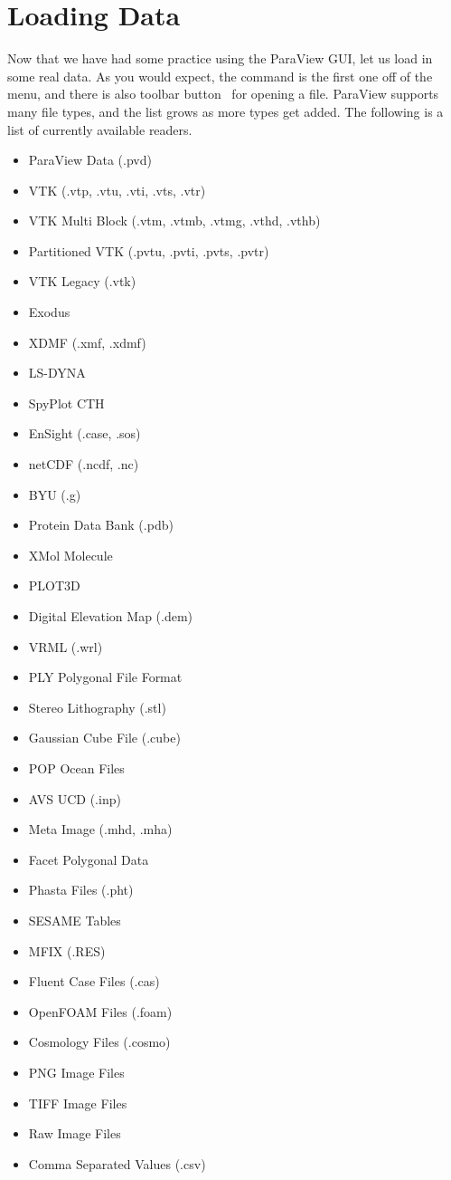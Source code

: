 \section{Loading Data}

Now that we have had some practice using the ParaView GUI, let us load in
some real data.  As you would expect, the  command is the first
one off of the  menu, and there is also toolbar
button~ for opening a file.  ParaView supports many file
types, and the list grows as more types get added.  The following is a list
of currently available readers.

\begin{multicols}{2}
  \begin{itemize}
  \item ParaView Data (.pvd)
  \item VTK (.vtp, .vtu, .vti, .vts, .vtr)
  \item VTK Multi Block (.vtm, .vtmb, .vtmg, .vthd, .vthb)
  \item Partitioned VTK (.pvtu, .pvti, .pvts, .pvtr)
  \item VTK Legacy (.vtk)
  \item Exodus
  \item XDMF (.xmf, .xdmf)
  \item LS-DYNA
  \item SpyPlot CTH
  \item EnSight (.case, .sos)
  \item netCDF (.ncdf, .nc)
  \item BYU (.g)
  \item Protein Data Bank (.pdb)
  \item XMol Molecule
  \item PLOT3D
  \item Digital Elevation Map (.dem)
  \item VRML (.wrl)
  \item PLY Polygonal File Format
  \item Stereo Lithography (.stl)
  \item Gaussian Cube File (.cube)
  \item POP Ocean Files
  \item AVS UCD (.inp)
  \item Meta Image (.mhd, .mha)
  \item Facet Polygonal Data
  \item Phasta Files (.pht)
  \item SESAME Tables
  \item MFIX (.RES)
  \item Fluent Case Files (.cas)
  \item OpenFOAM Files (.foam)
  \item Cosmology Files (.cosmo)
  \item PNG Image Files
  \item TIFF Image Files
  \item Raw Image Files
  \item Comma Separated Values (.csv)
  \end{itemize}
\end{multicols}

